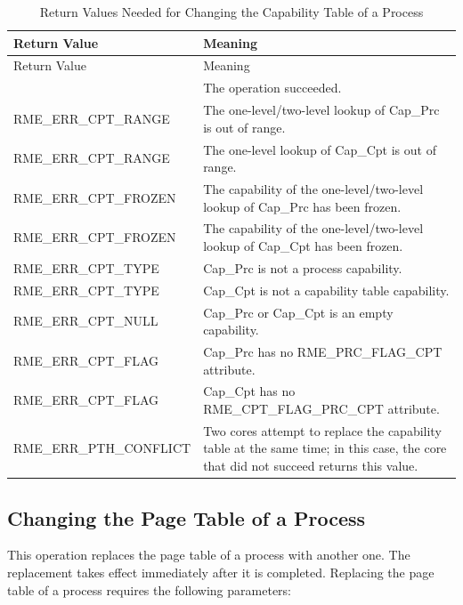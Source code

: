 \begin{xltabular}{\textwidth}{@{}>{\hsize\raggedright\arraybackslash}X>{\hsize\raggedright\arraybackslash}X@{}}
\caption{Return Values Needed for Changing the Capability Table of a Process}\label{tab:4-15-change-process-capability-table-return-values}\\
\toprule
Return Value & Meaning\tabularnewline
\endfirsthead
\toprule
Return Value & Meaning\tabularnewline
\midrule
\endhead
\bottomrule
{} & The operation succeeded.\tabularnewline
    RME\_ERR\_CPT\_RANGE & The one-level/two-level lookup of Cap\_Prc is out of range.\tabularnewline
    RME\_ERR\_CPT\_RANGE & The one-level lookup of Cap\_Cpt is out of range.\tabularnewline
    RME\_ERR\_CPT\_FROZEN & The capability of the one-level/two-level lookup of Cap\_Prc has been frozen.\tabularnewline
    RME\_ERR\_CPT\_FROZEN & The capability of the one-level/two-level lookup of Cap\_Cpt has been frozen.\tabularnewline
    RME\_ERR\_CPT\_TYPE & Cap\_Prc is not a process capability.\tabularnewline
    RME\_ERR\_CPT\_TYPE & Cap\_Cpt is not a capability table capability.\tabularnewline
    RME\_ERR\_CPT\_NULL & Cap\_Prc or Cap\_Cpt is an empty capability.\tabularnewline
    RME\_ERR\_CPT\_FLAG & Cap\_Prc has no RME\_PRC\_FLAG\_CPT attribute.\tabularnewline
    RME\_ERR\_CPT\_FLAG & Cap\_Cpt has no RME\_CPT\_FLAG\_PRC\_CPT attribute.\tabularnewline
    RME\_ERR\_PTH\_CONFLICT & Two cores attempt to replace the capability table at the same time; in this case, the core that did not succeed returns this value.\tabularnewline
\end{xltabular}
\nopagebreak[4]

\subsection{Changing the Page Table of a Process}\label{subsec:4-change-process-page-table}

This operation replaces the page table of a process with another one. The replacement takes effect immediately after it is completed. Replacing the page table of a process requires the following parameters:

